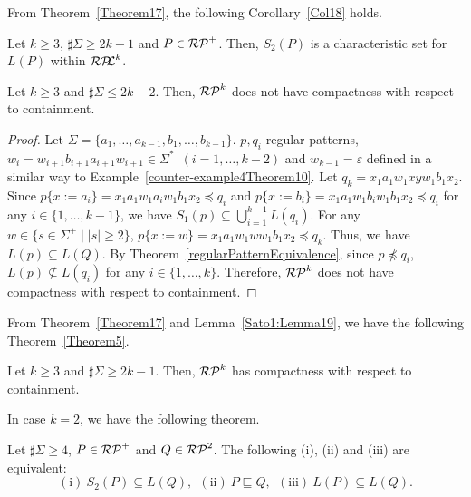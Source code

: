 From Theorem~\ref{Theorem17}, 
the following Corollary~\ref{Col18} holds.


\begin{col}\label{Col18}
    Let $k \geq 3$, $\sharp\Sigma \geq 2k-1$ and $P \in \mathcal{RP}^{+}$.
    Then, $S_{2}(P)$ is a characteristic set for $L(P)$ within $\mathcal{RP\!\!L}^{k}$.
\end{col}


\begin{lem}\label{Sato1:Lemma19}%
    Let $k \geq 3$ and $\sharp\Sigma \leq 2k-2$.
    Then, $\mathcal{RP}^{k}$ does not have compactness with respect to containment.
\end{lem}

\begin{proof}
    Let $\Sigma =\{a_{1},\ldots,a_{k-1},b_{1},\ldots,b_{k-1}\}${\color{red}. 
    $p, q_{i}$ regular patterns, $w_{i}=w_{i+1}b_{i+1}a_{i+1}w_{i+1} \in \Sigma^{\ast}$\ $(i=1,\ldots,k-2)$ and $w_{k-1}=\varepsilon$}
    defined in a similar way to Example~\ref{counter-example4Theorem10}. %
    Let $q_{k}=x_{1}a_{1}w_{1}xyw_{1}b_{1}x_{2}$.
    Since
    $p\{x:=a_{i}\} = x_{1}a_{1}w_{1}a_{i}w_{1}b_{1}x_{2} \preceq q_{i}$ and
    $p\{x:=b_{i}\} = x_{1}a_{1}w_{1}b_{i}w_{1}b_{1}x_{2} \preceq q_{i}$
    for any $i \in \{1,\ldots,k-1\}$,
    we have $S_{1}(p) \subseteq \bigcup_{i=1}^{k-1}L(q_{i})$.
    For any $w \in \{s \in \Sigma^{+} \mid |s| \geq 2\}$,
    $p\{x:=w\}=x_{1}a_{1}w_{1}ww_{1}b_{1}x_{2} \preceq q_{k}$.
    Thus, we have $L(p) \subseteq L(Q)$.
    By Theorem~\ref{regularPatternEquivalence},
    since $p \not \preceq q_{i}$, $L(p) \not \subseteq L(q_{i})$
    for any $i \in \{1,\ldots, k\}$.
    Therefore, $\mathcal{RP}^{k}$ does not have compactness with respect to containment.
\end{proof}

From Theorem~\ref{Theorem17} and Lemma~\ref{Sato1:Lemma19}, 
we have the following Theorem~\ref{Theorem5}.

\begin{thm}\label{Theorem5}
    Let $k \geq 3$ and $\sharp\Sigma \geq 2k-1$.
    Then, $\mathcal{RP}^{k}$ has compactness with respect to containment.
\end{thm}

In case $k=2$, we have the following theorem.

\begin{thm}\label{Theorem21}
    Let $\sharp\Sigma \geq 4$, $P \in \mathcal{RP}^{+}$ and $Q \in \mathcal{RP}^{2}$.
    The following (i), (ii) and (iii) are equivalent:
    \[
        \mathrm{(i)}\ S_{2}(P) \subseteq L(Q),\ \
        \mathrm{(ii)}\ P \sqsubseteq Q, \ \
        \mathrm{(iii)}\ L(P) \subseteq L(Q).
    \]
\end{thm}


